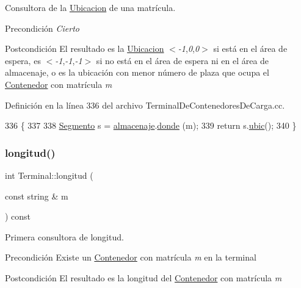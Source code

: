 Consultora de la \hyperlink{class_ubicacion}{Ubicacion} de una matrícula. 

\begin{DoxyPrecond}{Precondición}
{\itshape Cierto} 
\end{DoxyPrecond}
\begin{DoxyPostcond}{Postcondición}
El resultado es la \hyperlink{class_ubicacion}{Ubicacion} $<${\itshape -\/1},{\itshape 0},{\itshape 0}$>$ si está en el área de espera, es $<${\itshape -\/1},{\itshape -\/1},{\itshape -\/1}$>$ si no está en el área de espera ni en el área de almacenaje, o es la ubicación con menor número de plaza que ocupa el \hyperlink{class_contenedor}{Contenedor} con matrícula {\itshape m} 
\end{DoxyPostcond}


Definición en la línea 336 del archivo Terminal\+De\+Contenedores\+De\+Carga.\+cc.


\begin{DoxyCode}
336                                                 \{
337     
338     \hyperlink{class_segmento}{Segmento} s = \hyperlink{class_terminal_a1d87d7b16c4f460eee6f1ab73da90fd2}{almacenaje}.\hyperlink{class_almacenaje_afe08e4bca255d4baf3750019622e6cb2}{donde} (m);
339     \textcolor{keywordflow}{return} s.\hyperlink{class_segmento_aeb7bfd4dcac3a1a000a33582861e0d50}{ubic}();
340 \}
\end{DoxyCode}
\mbox{\label{class_terminal_afc6d0f22bcc642c6ac4355e0b02a7d79}} 
\subsubsection{\texorpdfstring{longitud()}{longitud()}}
{\footnotesize\ttfamily int Terminal\+::longitud (\begin{DoxyParamCaption}\item[{const string \&}]{m }\end{DoxyParamCaption}) const}



Primera consultora de longitud. 

\begin{DoxyPrecond}{Precondición}
Existe un \hyperlink{class_contenedor}{Contenedor} con matrícula {\itshape m} en la terminal 
\end{DoxyPrecond}
\begin{DoxyPostcond}{Postcondición}
El resultado es la longitud del \hyperlink{class_contenedor}{Contenedor} con matrícula {\itshape m} 
\end{DoxyPostcond}


